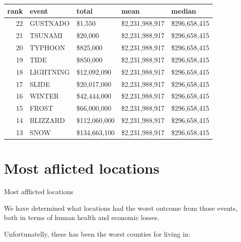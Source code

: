 \documentclass[]{article}
\newenvironment{Shaded}{\begin{snugshade}}{\end{snugshade}}
\newcommand{\KeywordTok}[1]{\textcolor[rgb]{0.13,0.29,0.53}{\textbf{{#1}}}}
\newcommand{\DataTypeTok}[1]{\textcolor[rgb]{0.13,0.29,0.53}{{#1}}}
\newcommand{\DecValTok}[1]{\textcolor[rgb]{0.00,0.00,0.81}{{#1}}}
\newcommand{\StringTok}[1]{\textcolor[rgb]{0.31,0.60,0.02}{{#1}}}
\newcommand{\CommentTok}[1]{\textcolor[rgb]{0.56,0.35,0.01}{\textit{{#1}}}}
\newcommand{\OtherTok}[1]{\textcolor[rgb]{0.56,0.35,0.01}{{#1}}}
\newcommand{\NormalTok}[1]{{#1}}
\begin{document}
\begin{longtable}[]{@{}rllll@{}}
\toprule
rank & event & total & mean & median\tabularnewline
\midrule
\endhead
22 & GUSTNADO & \$1,550 & \$2,231,988,917 & \$296,658,415\tabularnewline
21 & TSUNAMI & \$20,000 & \$2,231,988,917 & \$296,658,415\tabularnewline
20 & TYPHOON & \$825,000 & \$2,231,988,917 &
\$296,658,415\tabularnewline
19 & TIDE & \$850,000 & \$2,231,988,917 & \$296,658,415\tabularnewline
18 & LIGHTNING & \$12,092,090 & \$2,231,988,917 &
\$296,658,415\tabularnewline
17 & SLIDE & \$20,017,000 & \$2,231,988,917 &
\$296,658,415\tabularnewline
16 & WINTER & \$42,444,000 & \$2,231,988,917 &
\$296,658,415\tabularnewline
15 & FROST & \$66,000,000 & \$2,231,988,917 &
\$296,658,415\tabularnewline
14 & BLIZZARD & \$112,060,000 & \$2,231,988,917 &
\$296,658,415\tabularnewline
13 & SNOW & \$134,663,100 & \$2,231,988,917 &
\$296,658,415\tabularnewline
\bottomrule
\end{longtable}

\section{Most aflicted locations}\label{most-aflicted-locations}

Most afflicted locations

We have determined what locations had the worst outcome from those
events, both in terms of human health and economic losses.

Unfortunatelly, these has been the worst counties for living in:

\begin{Shaded}
\end{Shaded}
\end{document}
